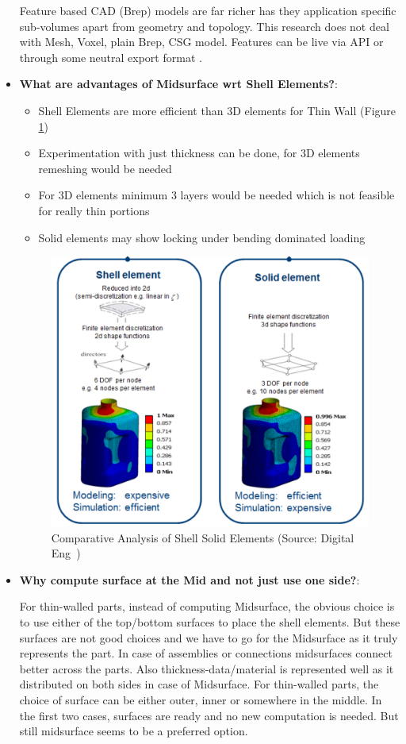 \begin{itemize}[noitemsep,topsep=2pt,parsep=2pt,partopsep=2pt,leftmargin=*]
Feature based CAD (Brep) models are far richer has they application specific sub-volumes apart from geometry and topology. This research does not deal with Mesh, Voxel, plain Brep, CSG model. Features can be live via API or through some neutral export format  \cite{Dabke1994}.

\item \textbf{What are advantages of Midsurface wrt Shell Elements?}:
	\begin{itemize}[noitemsep,topsep=2pt,parsep=2pt,partopsep=2pt,leftmargin=*]
	\item Shell Elements are more efficient than 3D elements for Thin Wall (Figure \ref{fig:litsurvey:shellsolidelems})
	\item Experimentation with just thickness can be done, for 3D elements remeshing would be needed
	\item For 3D elements minimum 3 layers would be needed which is not feasible for really thin portions
	\item Solid elements may show locking under bending dominated loading
	\end{itemize}
		

	\begin{figure} [!h]
		\centering
		\includegraphics[width=0.6\linewidth]{images/ShellSolidElems}
		\caption{Comparative Analysis of Shell Solid Elements (Source: Digital Eng~\cite{Abbey2013})}
		\label{fig:litsurvey:shellsolidelems}
	\end{figure}
	


	
\item \textbf{Why compute surface at the Mid and not just use one side?}: 

For thin-walled parts, instead of computing Midsurface, the obvious choice is to use either of the top/bottom surfaces to place the shell elements. But these surfaces are not good choices and we have to go for the Midsurface as it truly represents the part. In case of assemblies or connections midsurfaces connect better across the parts. Also thickness-data/material is represented well as it distributed on both sides in case of Midsurface. For thin-walled parts, the choice of surface can be either outer, inner or somewhere in the middle. In the first two cases, surfaces are ready and no new computation is needed. But still midsurface seems to be a preferred option. 


\end{itemize}

